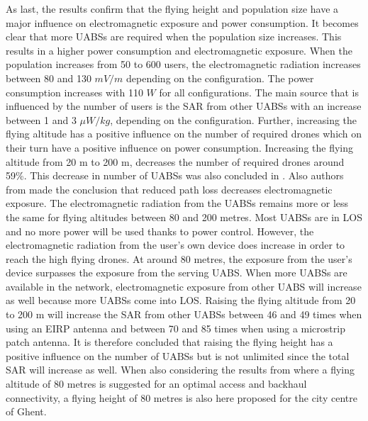 As last, the results confirm that the flying height and population size have a major influence on electromagnetic exposure and 
power consumption. It becomes clear that more \gls{UABS}s are required when the population size increases. 
This results in a higher power 
consumption and electromagnetic exposure. When the population increases from 50 to 600 users, 
the electromagnetic radiation increases between 80 and 130 $mV/m$ depending
on the configuration. The power consumption increases with 110 $W$ for all configurations. 
The main source that is influenced by the number of users is the \gls{SAR} from other UABSs with an increase between 1 and 3 $\mu W/kg$, depending on 
the configuration.
Further, increasing the flying altitude has a positive influence on the number of required drones which on their 
turn have a positive influence on power consumption. Increasing the flying altitude from 20 m to 200 m, decreases the number 
of required drones around 59\%. This decrease in number of \gls{UABS}s was also concluded in \cite{J2}.
Also authors from \cite{J17_kuehn2019modelling} made the conclusion that reduced path loss decreases electromagnetic exposure.
The electromagnetic radiation from the \gls{UABS}s remains more or less the same for flying altitudes between 80 and 200 metres. Most 
\gls{UABS}s are in \gls{LOS} and no more power will be used thanks to power control.
However, the electromagnetic radiation from the user's own device does increase in order to reach the high flying drones.
At around 80 metres, the exposure from the  user's device surpasses the exposure from the serving \gls{UABS}.
When more \gls{UABS}s are available in the network, electromagnetic exposure from other \gls{UABS} will increase as well 
because more \gls{UABS}s come into \gls{LOS}. Raising the flying altitude from 20 to 200 m will increase the \gls{SAR} from other 
\gls{UABS}s between 46 and 49 times when using an \gls{EIRP} antenna and between 70 and 85 times when using a microstrip patch antenna.
It is therefore concluded that raising the flying height has a positive influence on the number of 
\gls{UABS}s but is not unlimited since the total \gls{SAR} will increase as well.
When also considering the results from \cite{U1} where a flying altitude of  
80 metres is suggested for an optimal access and backhaul connectivity, a flying height 
of 80 metres is also here proposed for the city centre of Ghent.

